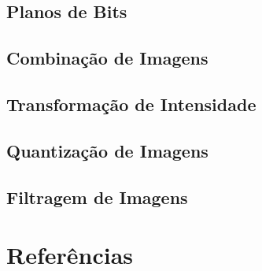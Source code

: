\documentclass[12pt]{article}
\begin{document}
    \subsection{Planos de Bits}
    
    \subsection{Combinação de Imagens}
    
    \subsection{Transformação de Intensidade}
    
    \subsection{Quantização de Imagens}
    
    \subsection{Filtragem de Imagens}
    

\section{Referências}
    

\end{document}
